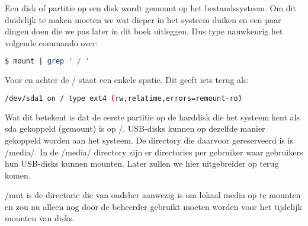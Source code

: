 Een disk of partitie op een disk wordt gemount op het bestandssysteem. Om dit duidelijk te maken moeten we wat dieper in
het systeem duiken en een paar dingen doen die we pas later in dit boek uitleggen. Dus type nauwkeurig het volgende
commando over:

\begin{lstlisting}[language=bash]
$ mount | grep ' / '
\end{lstlisting}

Voor en achter de / staat een enkele spatie. Dit geeft iets terug als:
\begin{lstlisting}[language=bash]
/dev/sda1 on / type ext4 (rw,relatime,errors=remount-ro)
\end{lstlisting}

Wat dit betekent is dat de eerste partitie op de harddisk die het systeem kent als sda gekoppeld (gemount) is op /.
USB-disks kunnen op dezelfde manier gekoppeld worden aan het systeem. De directory die daarvoor gereserveerd is is
/media/. In de /media/ directory zijn er directories per gebruiker waar gebruikers hun USB-disks kunnen mounten. Later
zullen we hier uitgebreider op terug komen.

/mnt is de directorie die van oudsher aanwezig is om lokaal media op te mounten en zou nu alleen nog door de beheerder
gebruikt moeten worden voor het tijdelijk mounten van disks.
